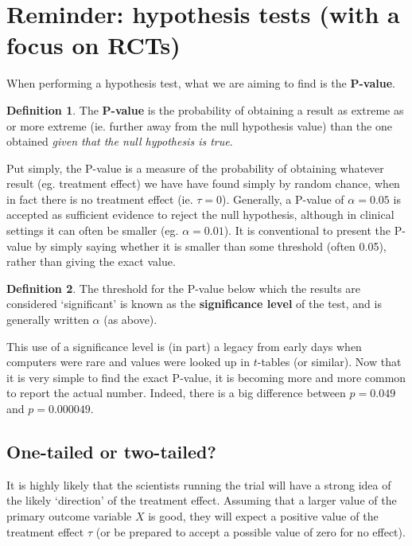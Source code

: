 \documentclass[
  openany]{book}
\theoremstyle{definition}
\newtheorem{definition}{Definition}[chapter]
\theoremstyle{definition}
\theoremstyle{definition}
\theoremstyle{definition}
\theoremstyle{remark}
\begin{document}
\section{Reminder: hypothesis tests (with a focus on RCTs)}\label{reminder-hypothesis-tests-with-a-focus-on-rcts}

When performing a hypothesis test, what we are aiming to find is the \textbf{P-value}.

\begin{definition}
The \textbf{P-value} is the probability of obtaining a result as extreme as or more extreme (ie. further away from the null hypothesis value) than the one obtained \emph{given that the null hypothesis is true}.
\end{definition}

Put simply, the P-value is a measure of the probability of obtaining whatever result (eg. treatment effect) we have have found simply by random chance, when in fact there is no treatment effect (ie. \(\tau=0\)). Generally, a P-value of \(\alpha = 0.05\) is accepted as sufficient evidence to reject the null hypothesis, although in clinical settings it can often be smaller (eg. \(\alpha = 0.01\)). It is conventional to present the P-value by simply saying whether it is smaller than some threshold (often 0.05), rather than giving the exact value.

\begin{definition}
The threshold for the P-value below which the results are considered `significant' is known as the \textbf{significance level} of the test, and is generally written \(\alpha\) (as above).
\end{definition}

This use of a significance level is (in part) a legacy from early days when computers were rare and values were looked up in \(t\)-tables (or similar). Now that it is very simple to find the exact P-value, it is becoming more and more common to report the actual number. Indeed, there is a big difference between \(p=0.049\) and \(p=0.000049\).

\subsection{One-tailed or two-tailed?}\label{one-tailed-or-two-tailed}

It is highly likely that the scientists running the trial will have a strong idea of the likely `direction' of the treatment effect. Assuming that a larger value of the primary outcome variable \(X\) is good, they will expect a positive value of the treatment effect \(\tau\) (or be prepared to accept a possible value of zero for no effect).
\end{document}
